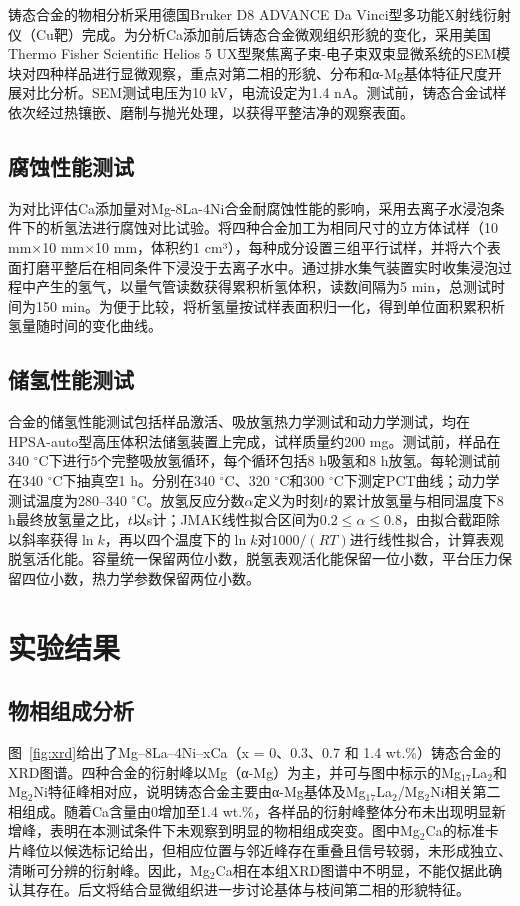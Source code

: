 \documentclass[preprint,12pt]{elsarticle}
\begin{document}
铸态合金的物相分析采用德国Bruker D8 ADVANCE Da Vinci型多功能X射线衍射仪（Cu靶）完成。为分析Ca添加前后铸态合金微观组织形貌的变化，采用美国Thermo Fisher Scientific Helios 5 UX型聚焦离子束-电子束双束显微系统的SEM模块对四种样品进行显微观察，重点对第二相的形貌、分布和α-Mg基体特征尺度开展对比分析。SEM测试电压为10 kV，电流设定为1.4 nA。测试前，铸态合金试样依次经过热镶嵌、磨制与抛光处理，以获得平整洁净的观察表面。

\subsection{腐蚀性能测试}

为对比评估Ca添加量对Mg-8La-4Ni合金耐腐蚀性能的影响，采用去离子水浸泡条件下的析氢法进行腐蚀对比试验。将四种合金加工为相同尺寸的立方体试样（10 mm×10 mm×10 mm，体积约1 cm³），每种成分设置三组平行试样，并将六个表面打磨平整后在相同条件下浸没于去离子水中。通过排水集气装置实时收集浸泡过程中产生的氢气，以量气管读数获得累积析氢体积，读数间隔为5 min，总测试时间为150 min。为便于比较，将析氢量按试样表面积归一化，得到单位面积累积析氢量随时间的变化曲线。

\subsection{储氢性能测试}

合金的储氢性能测试包括样品激活、吸放氢热力学测试和动力学测试，均在HPSA-auto型高压体积法储氢装置上完成，试样质量约200 mg。测试前，样品在340 $^\circ$C下进行5个完整吸放氢循环，每个循环包括8 h吸氢和8 h放氢。每轮测试前在340 $^\circ$C下抽真空1 h。分别在340 $^\circ$C、320 $^\circ$C和300 $^\circ$C下测定PCT曲线；动力学测试温度为280–340 $^\circ$C。放氢反应分数$\alpha$定义为时刻$t$的累计放氢量与相同温度下8 h最终放氢量之比，$t$以s计；JMAK线性拟合区间为$0.2\leq\alpha\leq0.8$，由拟合截距除以斜率获得$\ln k$，再以四个温度下的$\ln k$对$1000/(RT)$进行线性拟合，计算表观脱氢活化能。容量统一保留两位小数，脱氢表观活化能保留一位小数，平台压力保留四位小数，热力学参数保留两位小数。

\section{实验结果}

\subsection{物相组成分析}

图~\ref{fig:xrd}给出了Mg--8La--4Ni--xCa（x = 0、0.3、0.7 和 1.4 wt.\%）铸态合金的XRD图谱。四种合金的衍射峰以Mg（α-Mg）为主，并可与图中标示的Mg$_{17}$La$_2$和Mg$_2$Ni特征峰相对应，说明铸态合金主要由α-Mg基体及Mg$_{17}$La$_2$/Mg$_2$Ni相关第二相组成。随着Ca含量由0增加至1.4 wt.\%，各样品的衍射峰整体分布未出现明显新增峰，表明在本测试条件下未观察到明显的物相组成突变。图中Mg$_2$Ca的标准卡片峰位以候选标记给出，但相应位置与邻近峰存在重叠且信号较弱，未形成独立、清晰可分辨的衍射峰。因此，Mg$_2$Ca相在本组XRD图谱中不明显，不能仅据此确认其存在。后文将结合显微组织进一步讨论基体与枝间第二相的形貌特征。
\end{document}

